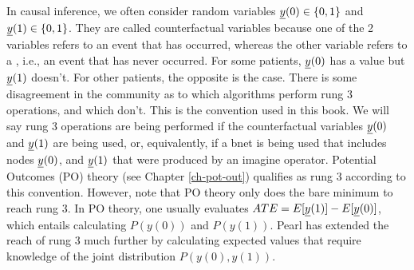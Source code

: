 In causal inference,
we often
consider  
random variables $\rvy(0)\in \bool$
and $\rvy(1)\in\bool$. They are called
counterfactual variables because
one of the 2 variables 
refers to an event that has occurred,
whereas the other variable
refers to a ,
i.e., an event that has never 
occurred. For some patients,
$\rvy(0)$ has a value
but $\rvy(1)$
doesn't.
For other 
patients,
the opposite 
is the case.
There is some
disagreement in the
community
as to which algorithms
perform rung 3 operations,
and which don't.
This is the convention
used in this book.
We will
say rung 3 operations
are being performed 
if
the counterfactual variables $\rvy(0)$
and $\rvy(1)$
are being used,
or, equivalently,
if a bnet
is being used that
includes nodes $\rvy(0)$, and $\rvy(1)$
that were produced by an imagine operator.
Potential Outcomes (PO)
theory (see Chapter \ref{ch-pot-out})
qualifies as rung 3 according
to this convention.
However, note that PO theory 
only does the bare minimum 
to reach rung 3.
In PO theory, one usually
evaluates $ATE=E[\rvy(1)]-E[\rvy(0)]$,
which entails
calculating $P(y(0))$
and $P(y(1))$.
Pearl has extended the reach of rung 3
much further 
by calculating expected
values that require knowledge of
the joint distribution $P(y(0), y(1))$.

